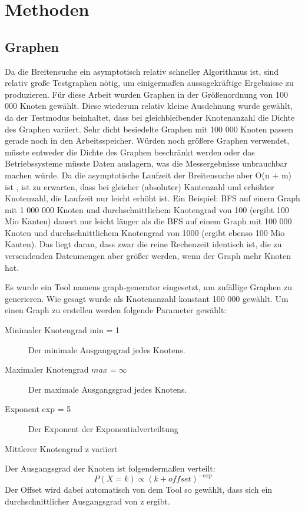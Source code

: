 
\chapter{Methoden} %
\label{cha:methoden}

\section{Graphen} %
\label{sec:graphen}
Da die Breitensuche ein asymptotisch relativ schneller Algorithmus ist, sind relativ große Testgraphen nötig, um einigermaßen aussagekräftige Ergebnisse zu produzieren. Für diese Arbeit wurden Graphen in der Größenordnung von 100 000 Knoten gewählt. Diese wiederum relativ kleine Ausdehnung wurde gewählt, da der Testmodus beinhaltet, dass bei gleichbleibender Knotenanzahl die Dichte des Graphen variiert. Sehr dicht besiedelte Graphen mit 100 000 Knoten passen gerade noch in den Arbeitsspeicher. Würden noch größere Graphen verwendet, müsste entweder die Dichte des Graphen beschränkt werden oder das Betriebssysteme müsste Daten auslagern, was die Messergebnisse unbrauchbar machen würde. Da die asymptotische Laufzeit der Breitensuche aber O(n + m) ist \cite{SWB-283374373}, ist zu erwarten, dass bei gleicher (absoluter) Kantenzahl und erhöhter Knotenzahl, die Laufzeit nur leicht erhöht ist. Ein Beispiel: BFS auf einem Graph mit 1 000 000 Knoten und durchschnittlichem Knotengrad von 100 (ergibt 100 Mio Kanten) dauert nur leicht länger als die BFS auf einem Graph mit 100 000 Knoten und durchschnittlichem Knotengrad von 1000 (ergibt ebenso 100 Mio Kanten). Das liegt daran, dass zwar die reine Rechenzeit identisch ist, die zu versendenden Datenmengen aber größer werden, wenn der Graph mehr Knoten hat.

Es wurde ein Tool namens graph-generator \cite{graph-generator:2009:Online} eingesetzt, um zufällige Graphen zu generieren. Wie gesagt wurde als Knotenanzahl konstant 100 000 gewählt. Um einen Graph zu erstellen werden folgende Parameter gewählt:
\begin{description}
	\item[Minimaler Knotengrad min = 1] Der minimale Ausgangsgrad jedes Knotens.
	\item[Maximaler Knotengrad $max = \infty$] Der maximale Ausgangsgrad jedes Knotens.
	\item[Exponent exp = 5] Der Exponent der Exponentialverteiltung
	\item[Mittlerer Knotengrad z variiert]
\end{description}
Der Ausgangsgrad der Knoten ist folgendermaßen verteilt:
$$
P(X=k) \propto (k + offset)^{-exp}
$$
Der Offset wird dabei automatisch von dem Tool so gewählt, dass sich ein durchschnittlicher Ausgangsgrad von z ergibt.

